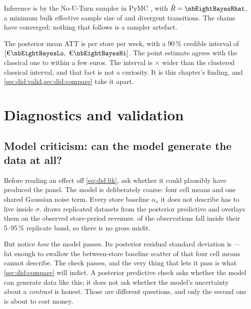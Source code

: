 Inference is by the No-U-Turn sampler \citep{hoffman2014} in PyMC \citep{salvatier2016}, with
$\hat R = \nbEightBayesRhat$, a minimum bulk effective sample size of \nbEightBayesEss{}
\citep{vehtari2021} and \nbEightBayesDiv{} divergent transitions. The chains have converged; nothing
that follows is a sampler artefact.

The posterior mean ATT is \eur{\nbEightBayesAtt} per store per week, with a 90\,\% credible interval
of $[\eur{\nbEightBayesLo},\ \eur{\nbEightBayesHi}]$. The point estimate agrees with the classical
one to within a few euros. The interval is \nbEightBayesOverCluster$\times$ wider than the clustered
classical interval, and that fact is not a curiosity. It is this chapter's finding, and
\cref{sec:did:valid,sec:did:compare} take it apart.

\section{Diagnostics and validation}
\label{sec:did:valid}

\subsection*{Model criticism: can the model generate the data at all?}

Before reading an effect off \cref{eq:did:lik}, ask whether it could plausibly have produced the
panel. The model is deliberately coarse: four cell means and one shared Gaussian noise term. Every
store baseline $\alpha_s$ it does not describe has to live inside $\sigma$.
 draws replicated datasets from the posterior predictive and overlays them on the
\nbEightNCollapsed{} observed store-period revenues. \pc{\nbEightPpcCov} of the observations fall
inside their 5--95\,\% replicate band, so there is no gross misfit.



But notice \emph{how} the model passes. Its posterior residual standard deviation is
\eur{\nbEightBayesSigma} --- fat enough to swallow the between-store baseline scatter of
\eur{\nbEightAlphaSd} that four cell means cannot describe. The check passes, and the very thing
that lets it pass is what \cref{sec:did:compare} will indict. A posterior predictive check asks
whether the model can generate data like this; it does not ask whether the model's uncertainty about
a \emph{contrast} is honest. Those are different questions, and only the second one is about to cost
money.

